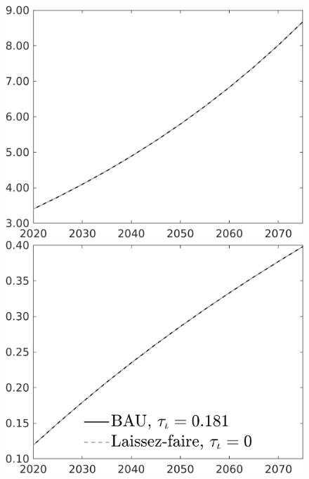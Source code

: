 \documentclass[12pt]{article}
\begin{document}
\begin{figure}[h!!]
\begin{minipage}[]{0.32\textwidth}
	\end{minipage}	
	\begin{minipage}[]{0.32\textwidth}
		\includegraphics[width=1\textwidth]{../../codding_model/own_basedOnFried/optimalPol_010922_revision/figures/all_13Sept22/CompTaul_Equlab_LFBAU_Reg0_wh_spillover0_nsk1_xgr0_knspil0_sep1_countec0_GovRev0_etaa0.79_lgd0.png}
	\end{minipage}	
	\begin{minipage}[]{0.32\textwidth}
		\includegraphics[width=1\textwidth]{../../codding_model/own_basedOnFried/optimalPol_010922_revision/figures/all_13Sept22/CompTaul_Equlab_LFBAU_Reg0_GFF_spillover0_nsk1_xgr0_knspil0_sep1_countec0_GovRev0_etaa0.79_lgd1.png}

\end{minipage}
\end{figure}
\end{document}
